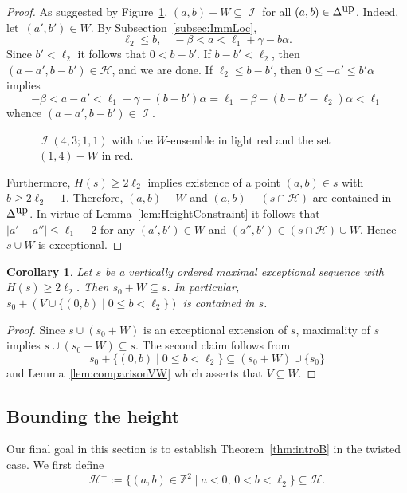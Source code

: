 \documentclass[11pt]{article}
\newtheorem{coro}[theo]{Corollary}
\theoremstyle{definition}
\numberwithin{equation}{section}
\newcommand{\cH}{\mathcal{H}}
\newcommand{\Z}{\mathbb Z}
\newcommand{\CH}{{\mathcal H}}
\newcommand{\CI}{{\mathcal I}}
\newcommand{\ko}{\overline}
\newcommand{\cb}{{\ko{c}}}
\newcommand{\nImm}{\operatorname{\CI}}
\newcommand{\xa}{\alpha}
\newcommand{\xb}{\beta}
\newcommand{\xc}{{\gamma}}
\newcommand{\gammaText}[1]{{#1}}
\newcommand{\noGammaText}[1]{}
\newcommand{\cl}{s}
\newcommand{\DeltaUp}{\Delta^{\mbox{\tiny up}}}
\newcommand{\mes}{maximal exceptional sequence}
\newcommand{\wbox}{ensemble}
\newcommand{\ssect}[1]{Subsection~\ref{#1}}
\newcommand{\thHeight}{\ref{thm:introB}}
\newcommand{\immreg}[4]{
\def\la{#1} 
\def\lb{#2} 
\def\ch{#3} 
\def\cb{#4} 
\draw[color=oliwkowy!40] (-\cb-0.3,-\la/\ch) grid (\la+0.3,\lb+\la/\ch);
\fill[pattern color=parallelogram, pattern=north west lines]
  (0,0) -- (\la,-\la/\ch) -- (\la,0) -- cycle
  (\la-\cb,\lb) -- (-\cb,\lb+\la/\ch) -- (-\cb,\lb) -- cycle;
\draw[thick, color=black]
  (0,0) -- (\la,-\la/\ch) -- (\la,0)
  (\la-\cb,\lb) -- (-\cb,\lb+\la/\ch) -- (-\cb,\lb);
\fill[pattern color=parallelogram, pattern=north west lines]
  (0,0) -- (-\cb,\cb/\ch) -- (-\cb,\lb) --
  (\la-\cb,\lb) -- (\la,\lb-\cb/\ch) -- (\la,0) -- cycle;
\fill[thick, color=origin]
  (0,0) circle (5pt);
\draw[thick, color=origin]
  (\la-\cb,\lb) circle (5pt)
  (-0.5,-0.5) node{$0$};
\foreach \xa in {-1,...,1}
\foreach \xb in {-\cb,...,\la}
\foreach \y in {2,...,\lb} {
  \fill[thick, color=regi]
    (\xa-\cb,\y-1) circle (5pt)
    (\xb+1,\y-1) circle (5pt); }
\pgfmathsetmacro{\hMax}{(\la-2)/\ch}
\foreach \y in {0,...,\hMax} {
  \pgfmathsetmacro{\wMax}{\la-\ch*\y-1}
  \foreach \x in {1,...,\wMax} {
    \fill[thick, color=regii]
      (\la-\x,-\y) circle (5pt)
      (\x-\cb,\y+\lb) circle (5pt); }}
\foreach \x in {2,...,\la} {
  \fill[thick, color=regii]
  (\x-1,0) circle (5pt)
  (\la-\cb-\x+1,\lb) circle (5pt); }
}
\begin{document}
\begin{proof}
As suggested by 
Figure~\ref{fig:WBoxTriangle}, 
$(a,b)-W\subseteq\nImm$ for all 
$(a,b)\in\DeltaUp$. Indeed, let~$(a',b')\in W$. 
By \ssect{subsec:ImmLoc},
$$
\ell_2\leq b,\quad-\xb<a<
\noGammaText{\ell_1-\xb-(b-\ell_2)\xa}
\gammaText{\ell_1 + \xc -b\xa}.
$$
Since $b'<\ell_2$ it follows that $0<b-b'$. 
If $b-b'<\ell_2$, then $(a-a',b-b')\in\cH$, 
and we are done. If $\ell_2\leq b-b'$, then 
$0\leq-a'\leq b'\xa$ 
implies 
$$
-\xb<a-a'<
\gammaText{\ell_1+\xc-(b-b')\xa}
=\ell_1-\xb-(b-b'-\ell_2)\xa<\ell_1
$$
whence $(a-a',b-b')\in\nImm$.

\begin{figure}[ht]
\caption{$\nImm(4,3;1,1)$ with the $W$-{\wbox} in 
light red and the set $(1,4)-W$ in red.}
\label{fig:WBoxTriangle}
\end{figure}

Furthermore, $H(\cl)\geq2\ell_2$ implies 
existence of a point $(a,b)\in\cl$ with 
${b\geq2\ell_2-1}$. Therefore, $(a,b)-W$ and
$(a,b)-(\cl\cap\cH)$ are contained in 
$\DeltaUp$. In virtue of 
Lemma~\ref{lem:HeightConstraint} 
it follows that $|a'-a''|\leq\ell_1-2$ 
for any $(a',b')\in W$ and $(a'',b')\in(\cl\cap\cH)\cup W$. 
Hence $\cl\cup W$ is exceptional.
\end{proof}

\begin{coro}\label{cor:WBox}
Let $\cl$ be a vertically ordered {\mes} with 
$H(\cl)\geq2\ell_2$. Then $\cl_0+W\subseteq\cl$. 
In particular, $\cl_0+(V\cup\{(0,b)\mid0\leq b<\ell_2\})$
is contained in $\cl$.
\end{coro}

\begin{proof}
Since $\cl\cup(\cl_0+W)$ is an exceptional extension 
of $\cl$, maximality of $\cl$ implies 
$\cl\cup(\cl_0+W)\subseteq\cl$. The second claim 
follows from
$$
\cl_0+\{(0,b)\mid0\leq b<\ell_2\}\subseteq
(\cl_0+W)\cup\{\cl_0\}
$$
and Lemma~\ref{lem:comparisonVW} which asserts that 
$V\subseteq W$.
\end{proof}

\subsection{Bounding the height}
\label{subsec:BoundHeight}
Our final goal in this section is to establish 
Theorem~{\thHeight} in the twisted case. We first define
$$
\cH^-:=\{(a,b)\in\Z^2\mid a<0,\,0<b<\ell_2\}\subseteq\CH.
$$
\end{document}
